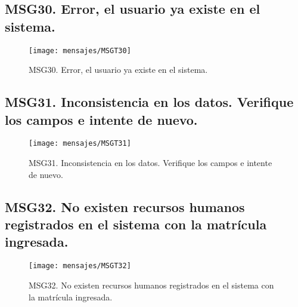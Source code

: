 \subsection{MSG30. Error, el usuario ya existe en el sistema.}
    \begin{figure}[htbp]
        \begin{center}
            \texttt{[image: mensajes/MSGT30]}
            \caption{MSG30. Error, el usuario ya existe en el sistema.}
            \label{fig:MSG30}
        \end{center}
    \end{figure} 

\subsection{MSG31. Inconsistencia en los datos. Verifique los campos e intente de nuevo.}
    \begin{figure}[htbp]
        \begin{center}
            \texttt{[image: mensajes/MSGT31]}
            \caption{MSG31. Inconsistencia en los datos. Verifique los campos e intente de nuevo.}
            \label{fig:MSG31}
        \end{center}
    \end{figure}

\subsection{MSG32. No existen recursos humanos registrados en el sistema con la matrícula ingresada.}
    \begin{figure}[htbp]
        \begin{center}
            \texttt{[image: mensajes/MSGT32]}
            \caption{MSG32. No existen recursos humanos registrados en el sistema con la matrícula ingresada.}
            \label{fig:MSG32}
        \end{center}
    \end{figure}  
    
    

